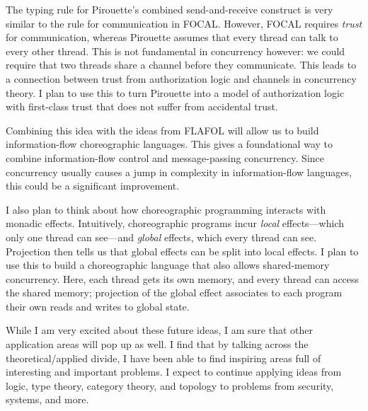 \documentclass{article}
\theoremstyle{definition}
\begin{document}
The typing rule for Pirouette's combined send-and-receive construct is very similar to the rule for communication in FOCAL.
However, FOCAL requires \emph{trust} for communication, whereas Pirouette assumes that every thread can talk to every other thread.
This is not fundamental in concurrency however: we could require that two threads share a channel before they communicate.
This leads to a connection between trust from authorization logic and channels in concurrency theory.
I plan to use this to turn Pirouette into a model of authorization logic with first-class trust that does not suffer from accidental trust.

Combining this idea with the ideas from FLAFOL will allow us to build information-flow choreographic languages.
This gives a foundational way to combine information-flow control and message-passing concurrency.
Since concurrency usually causes a jump in complexity in information-flow languages, this could be a significant improvement.

I also plan to think about how choreographic programming interacts with monadic effects.
Intuitively, choreographic programs incur \emph{local} effects---which only one thread can see---and \emph{global} effects, which every thread can see.
Projection then tells us that global effects can be split into local effects.
I plan to use this to build a choreographic language that also allows shared-memory concurrency.
Here, each thread gets its own memory, and every thread can access the shared memory; projection of the global effect associates to each program their own reads and writes to global state.

While I am very excited about these future ideas, I am sure that other application areas will pop up as well.
I find that by talking across the theoretical/applied divide, I have been able to find inspiring areas full of interesting and important problems.
I expect to continue applying ideas from logic, type theory, category theory, and topology to problems from security, systems, and more.


\end{document}
